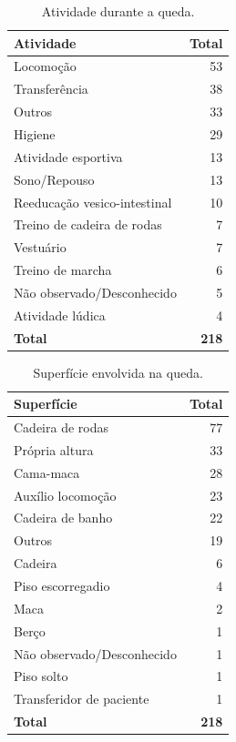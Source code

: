 \documentclass[
  a4paper]{article}
\begin{document}
\begin{table}[H]

\caption{\label{tab:unnamed-chunk-10}Atividade durante a queda.}
\centering
\begin{tabular}[t]{lr}
\toprule
Atividade & Total\\
\midrule
Locomoção & 53\\
Transferência & 38\\
Outros & 33\\
Higiene & 29\\
Atividade esportiva & 13\\
\addlinespace
Sono/Repouso & 13\\
Reeducação vesico-intestinal & 10\\
Treino de cadeira de rodas & 7\\
Vestuário & 7\\
Treino de marcha & 6\\
\addlinespace
Não observado/Desconhecido & 5\\
Atividade lúdica & 4\\
\midrule
\textbf{Total} & \textbf{218}\\
\bottomrule
\end{tabular}
\end{table}

\begin{table}[H]

\caption{\label{tab:unnamed-chunk-11}Superfície envolvida na queda.}
\centering
\begin{tabular}[t]{lr}
\toprule
Superfície & Total\\
\midrule
Cadeira de rodas & 77\\
Própria altura & 33\\
Cama-maca & 28\\
Auxílio locomoção & 23\\
Cadeira de banho & 22\\
\addlinespace
Outros & 19\\
Cadeira & 6\\
Piso escorregadio & 4\\
Maca & 2\\
Berço & 1\\
\addlinespace
Não observado/Desconhecido & 1\\
Piso solto & 1\\
Transferidor de paciente & 1\\
\midrule
\textbf{Total} & \textbf{218}\\
\bottomrule
\end{tabular}
\end{table}
\end{document}
